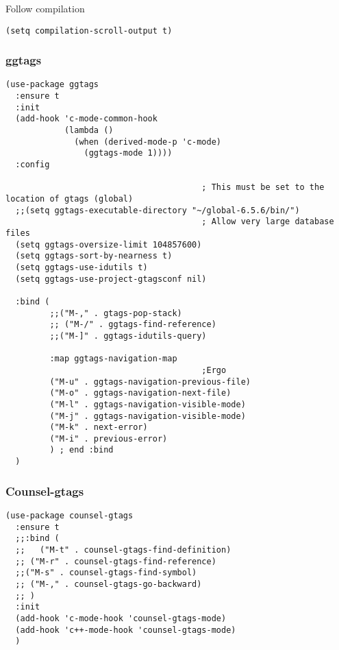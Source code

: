 \documentclass[12pt]{article}
\begin{document}
Follow compilation

\begin{verbatim}
(setq compilation-scroll-output t)
\end{verbatim}



\subsubsection{ggtags}
\label{sec:orgd4fa8a4}


\begin{verbatim}
(use-package ggtags
  :ensure t
  :init
  (add-hook 'c-mode-common-hook
            (lambda ()
              (when (derived-mode-p 'c-mode)
                (ggtags-mode 1))))
  :config

                                        ; This must be set to the location of gtags (global)
  ;;(setq ggtags-executable-directory "~/global-6.5.6/bin/")
                                        ; Allow very large database files
  (setq ggtags-oversize-limit 104857600)
  (setq ggtags-sort-by-nearness t)
  (setq ggtags-use-idutils t)
  (setq ggtags-use-project-gtagsconf nil)

  :bind (
         ;;("M-," . gtags-pop-stack)
         ;; ("M-/" . ggtags-find-reference)
         ;;("M-]" . ggtags-idutils-query)

         :map ggtags-navigation-map
                                        ;Ergo
         ("M-u" . ggtags-navigation-previous-file)
         ("M-o" . ggtags-navigation-next-file)
         ("M-l" . ggtags-navigation-visible-mode)
         ("M-j" . ggtags-navigation-visible-mode)
         ("M-k" . next-error)
         ("M-i" . previous-error)
         ) ; end :bind
  )

\end{verbatim}

\subsubsection{Counsel-gtags}
\label{sec:orge97d4ad}

\begin{verbatim}
(use-package counsel-gtags
  :ensure t
  ;;:bind (
  ;;   ("M-t" . counsel-gtags-find-definition)
  ;; ("M-r" . counsel-gtags-find-reference)
  ;;("M-s" . counsel-gtags-find-symbol)
  ;; ("M-," . counsel-gtags-go-backward)
  ;; )
  :init 
  (add-hook 'c-mode-hook 'counsel-gtags-mode)
  (add-hook 'c++-mode-hook 'counsel-gtags-mode)
  )

\end{verbatim}
\end{document}
